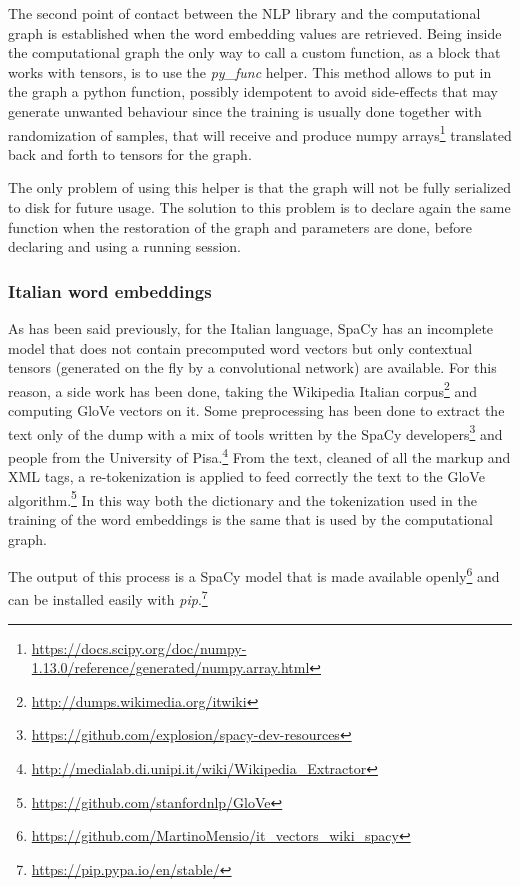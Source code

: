 The second point of contact between the NLP library and the computational graph is established when the word embedding values are retrieved. Being inside the computational graph the only way to call a custom function, as a block that works with tensors, is to use the \textit{py\_func} helper. This method allows to put in the graph a python function, possibly idempotent to avoid side-effects that may generate unwanted behaviour since the training is usually done together with randomization of samples, that will receive and produce numpy arrays\footnote{\url{https://docs.scipy.org/doc/numpy-1.13.0/reference/generated/numpy.array.html}} translated back and forth to tensors for the graph.

The only problem of using this helper is that the graph will not be fully serialized to disk for future usage. The solution to this problem is to declare again the same function when the restoration of the graph and parameters are done, before declaring and using a running session.

\subsubsection{Italian word embeddings}
As has been said previously, for the Italian language, SpaCy has an incomplete model that does not contain precomputed word vectors but only contextual tensors (generated on the fly by a convolutional network) are available. For this reason, a side work has been done, taking the Wikipedia Italian corpus\footnote{\url{http://dumps.wikimedia.org/itwiki}} and computing GloVe vectors on it. Some preprocessing has been done to extract the text only of the dump with a mix of tools written by the SpaCy developers\footnote{\url{https://github.com/explosion/spacy-dev-resources}} and people from the University of Pisa.\footnote{\url{http://medialab.di.unipi.it/wiki/Wikipedia\_Extractor}} From the text, cleaned of all the markup and XML tags, a re-tokenization is applied to feed correctly the text to the GloVe algorithm.\footnote{\url{https://github.com/stanfordnlp/GloVe}} In this way both the dictionary and the tokenization used in the training of the word embeddings is the same that is used by the computational graph.

The output of this process is a SpaCy model that is made available openly\footnote{\url{https://github.com/MartinoMensio/it\_vectors\_wiki\_spacy}} and can be installed easily with \textit{pip}.\footnote{\url{https://pip.pypa.io/en/stable/}}

